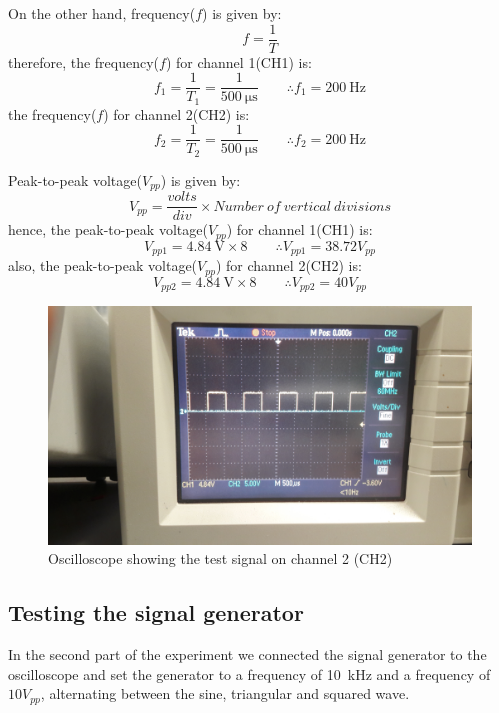 \documentclass[letterpaper]{article}
\begin{document}
On the other hand, frequency($f$) is given by:
\[f = \frac{1}{T}\]
therefore, the frequency($f$) for channel 1(CH1) is:
\[f_1 = \frac{1}{T_1} = \frac{1}{\SI{500}{\micro\second}}\qquad \therefore f_1 = \SI{200}{\hertz}\]
the frequency($f$) for channel 2(CH2) is:
\[f_2 = \frac{1}{T_2} = \frac{1}{\SI{500}{\micro\second}}\qquad \therefore f_2 = \SI{200}{\hertz}\]

Peak-to-peak voltage($V_{pp}$) is given by:
\[V_{pp} = \frac{volts}{div}\times Number\ of\ vertical\ divisions\]
hence, the peak-to-peak voltage($V_{pp}$) for channel 1(CH1) is:
\[V_{pp1} = \SI{4.84}{\volt}\times8\qquad\therefore V_{pp1} = 38.72V_{pp}\]
also, the peak-to-peak voltage($V_{pp}$) for channel 2(CH2) is:
\[V_{pp2} = \SI{4.84}{\volt}\times8\qquad\therefore V_{pp2} = 40V_{pp}\]
\begin{figure}[H]
    \centering
    \includegraphics[width=.5\linewidth,angle=180]{img/part1/4}
    \caption{Oscilloscope showing the test signal on channel 2 (CH2)}
\end{figure}
\subsection{Testing the signal generator}
In the second part of the experiment we connected the signal generator to the oscilloscope and
set the generator to a frequency of \SI{10}{\kilo\hertz} and a frequency of $10 V_{pp}$,
alternating between the sine, triangular and squared wave.\\[2ex]
\end{document}
